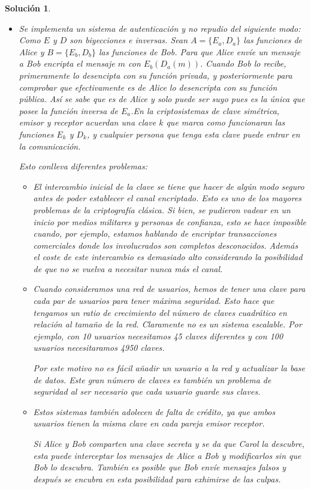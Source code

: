 \documentclass[
  a4paper,
  spanish,
  12pt,
]{scrartcl}
\theoremstyle{ejercicio-style}
\theoremstyle{remark-style}
\newtheorem*{sol}{Solución}
\begin{document}
\begin{sol}
\begin{itemize}
\item Se implementa un sistema de autenticación y no repudio del siguiente modo: Como $E$ y $D$ son biyecciones e inversas. Sean $A = \{ E_a, D_a \}$ las funciones de Alice y $B = \{ E_b, D_b \}$ las funciones de Bob. Para que Alice envíe un mensaje a Bob encripta el mensaje $m$ con $E_b(D_a(m))$. Cuando Bob lo recibe, primeramente lo desencipta con su función privada, y posteriormente para comprobar que efectivamente es de Alice lo desencripta con su función pública. Así se sabe que es de Alice y solo puede ser suyo pues es la única que posee la función inversa de $E_a$.En la criptosistemas de clave simétrica, emisor y receptor acuerdan una clave $k$ que marca como funcionaran las funciones $E_k$ y $D_k$, y cualquier persona que tenga esta clave puede entrar en la comunicación.

Esto conlleva diferentes problemas:
\begin{itemize}
\item El intercambio inicial de la clave se tiene que hacer de algún modo seguro antes de poder establecer el canal encriptado. Esto es uno de los mayores problemas de la criptografía clásica. Si bien, se pudieron vadear en un inicio por medios militares y personas de confianza, esto se hace imposible cuando, por ejemplo, estamos hablando de encriptar transacciones comerciales donde los involucrados son completos desconocidos. Además el coste de este intercambio es demasiado alto considerando la posibilidad de que no se vuelva a necesitar nunca más el canal.
\item Cuando consideramos una red de usuarios, hemos de tener una clave para cada par de usuarios para tener máxima seguridad. Esto hace que tengamos un ratio de crecimiento del número de claves cuadrático en relación al tamaño de la red. Claramente no es un sistema escalable. Por ejemplo, con 10 usuarios necesitamos 45 claves diferentes y con 100 usuarios necesitaramos 4950 claves.

Por este motivo no es fácil añadir un usuario a la red y actualizar la base de datos. Este gran número de claves es también un problema de seguridad al ser necesario que cada usuario guarde sus claves.

\item Estos sistemas también adolecen de falta de crédito, ya que ambos usuarios tienen la misma clave en cada pareja emisor receptor.

Si Alice y Bob comparten una clave secreta y se da que Carol la descubre, esta puede interceptar los mensajes de Alice a Bob y modificarlos sin que Bob lo descubra. También es posible que Bob envíe mensajes falsos y después se encubra en esta posibilidad para exhimirse de las culpas.
\end{itemize}


\end{itemize}
\end{sol}
\end{document}
